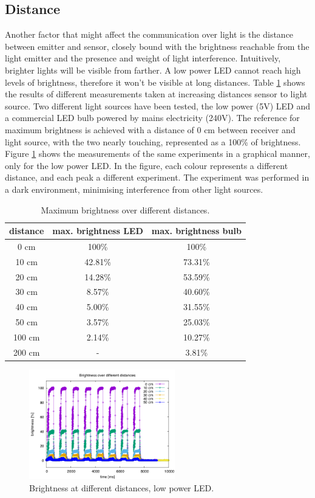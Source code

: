 \subsection{Distance}
\label{distancephy}
Another factor that might affect the communication over light is the distance between emitter and sensor, closely bound with the brightness reachable from the light emitter and the presence and weight of light interference.
Intuitively, brighter lights will be visible from farther.
A low power LED cannot reach high levels of brightness, therefore it won't be visible at long distances.
Table \ref{tab:distancesphy} shows the results of different measurements taken at increasing distances sensor to light source.
Two different light sources have been tested, the low power (5V) LED and a commercial LED bulb powered by mains electricity (240V).
The reference for maximum brightness is achieved with a distance of 0 cm between receiver and light source, with the two nearly touching, represented as a 100\% of brightness.
Figure \ref{fig:distancephy} shows the measurements of the same experiments in a graphical manner, only for the low power LED.
In the figure, each colour represents a different distance, and each peak a different experiment.
The experiment was performed in a dark environment, minimising interference from other light sources.

\begin{table}[hbt]
\centering
  \begin{tabular}{c | c || c}
    distance & max. brightness LED & max. brightness bulb \\
    \hline
    0 cm & 100\% & 100\% \\
    10 cm & 42.81\% & 73.31\%\\
    20 cm & 14.28\% & 53.59\%\\
    30 cm & 8.57\% & 40.60\%\\
    40 cm & 5.00\% &31.55\%\\
    50 cm & 3.57\% & 25.03\%\\
    100 cm & 2.14\% & 10.27\%\\
    200 cm & - & 3.81\% \\
  \end{tabular}
 \caption{Maximum brightness over different distances.}
  \label{tab:distancesphy}
\end{table}

\begin{figure}[hbt]
	\centering
      \includegraphics[height=180px]{img/distancephy}
  \caption{Brightness at different distances, low power LED.}
  \label{fig:distancephy}
\end{figure}

